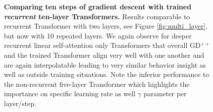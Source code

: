 \documentclass{article}
\theoremstyle{plain}
\theoremstyle{definition}
\theoremstyle{remark}
\begin{document}
\begin{figure}
\vspace{-3pt}
  \caption{\textbf{Comparing ten steps of gradient descent with trained \textit{recurrent} ten-layer Transformers.} Results comparable to recurrent Transformer with two layers, see Figure \ref{fig:multi_layer}, but now with 10 repeated layers. We again observe for deeper recurrent linear self-attention only Transformers that overall GD$^{++}$ and the trained Transformer align very well with one another and are again interpolatable leading to very similar behavior insight as well as outside training situations. Note the inferior performance to the non-recurrent five-layer Transformer which highlights the importance on specific learning rate as well $\gamma$ parameter per layer/step. }
  \label{fig:ten_layer}
  \vspace{-10pt}
\end{figure}
\end{document}
